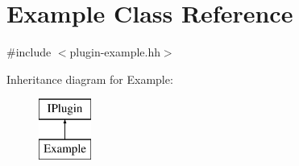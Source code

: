 \hypertarget{classExample}{}\section{Example Class Reference}
\label{classExample}


{\ttfamily \#include $<$plugin-\/example.\+hh$>$}

Inheritance diagram for Example\+:\begin{figure}[H]
\begin{center}
\leavevmode
\includegraphics[height=2.000000cm]{classExample}
\end{center}
\end{figure}
